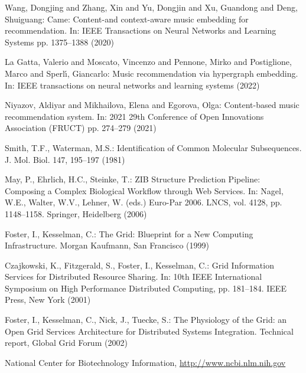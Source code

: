 \documentclass[runningheads,a4paper]{llncs}
\begin{document}
\begin{thebibliography}{4}

 Wang, Dongjing and Zhang, Xin and Yu, Dongjin and Xu, Guandong and Deng, Shuiguang: 
Came: Content-and context-aware music embedding for recommendation. In: IEEE Transactions on Neural Networks and Learning Systems
pp. 1375--1388 (2020)

 La Gatta, Valerio and Moscato, Vincenzo and Pennone, Mirko and Postiglione, Marco and Sperl{\'\i}, Giancarlo:
Music recommendation via hypergraph embedding. In: IEEE transactions on neural networks and learning systems (2022)

 Niyazov, Aldiyar and Mikhailova, Elena and Egorova, Olga:
Content-based music recommendation system. In: 2021 29th Conference of Open Innovations Association (FRUCT)
pp. 274--279 (2021)

 Smith, T.F., Waterman, M.S.: Identification of Common Molecular
Subsequences. J. Mol. Biol. 147, 195--197 (1981)

 May, P., Ehrlich, H.C., Steinke, T.: ZIB Structure Prediction Pipeline:
Composing a Complex Biological Workflow through Web Services. In: Nagel,
W.E., Walter, W.V., Lehner, W. (eds.) Euro-Par 2006. LNCS, vol. 4128,
pp. 1148--1158. Springer, Heidelberg (2006)

 Foster, I., Kesselman, C.: The Grid: Blueprint for a New Computing
Infrastructure. Morgan Kaufmann, San Francisco (1999)

 Czajkowski, K., Fitzgerald, S., Foster, I., Kesselman, C.: Grid
Information Services for Distributed Resource Sharing. In: 10th IEEE
International Symposium on High Performance Distributed Computing, pp.
181--184. IEEE Press, New York (2001)

 Foster, I., Kesselman, C., Nick, J., Tuecke, S.: The Physiology of the
Grid: an Open Grid Services Architecture for Distributed Systems
Integration. Technical report, Global Grid Forum (2002)

 National Center for Biotechnology Information, \url{http://www.ncbi.nlm.nih.gov}

\end{thebibliography}
\end{document}
